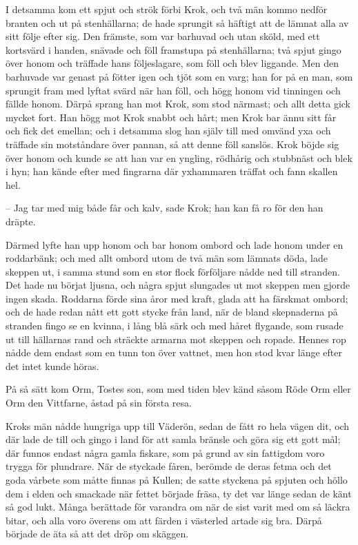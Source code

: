\initial I detsamma kom ett spjut och strök förbi Krok, och två män kommo nedför branten och ut på stenhällarna; de hade sprungit så häftigt att de lämnat alla av sitt följe efter sig. Den främste, som var barhuvad och utan sköld, med ett kortsvärd i handen, snävade och föll framstupa på stenhällarna; två spjut gingo över honom och träffade hans följeslagare, som föll och blev liggande. Men den barhuvade var genast på fötter igen och tjöt som en varg; han for på en man, som sprungit fram med lyftat svärd när han föll, och högg honom vid tinningen och fällde honom. Därpå sprang han mot Krok, som stod närmast; och allt detta gick mycket fort. Han högg mot Krok snabbt och hårt; men Krok bar ännu sitt får och fick det emellan; och i detsamma slog han själv till med omvänd yxa och träffade sin motståndare över pannan, så att denne föll sanslös. Krok böjde sig över honom och kunde se att han var en yngling, rödhårig och stubbnäst och blek i hyn; han kände efter med fingrarna där yxhammaren träffat och fann skallen hel.

– Jag tar med mig både får och kalv, sade Krok; han kan få ro för den han dräpte.

\initial Därmed lyfte han upp honom och bar honom ombord och lade honom under en roddarbänk; och med allt ombord utom de två män som lämnats döda, lade skeppen ut, i samma stund som en stor flock förföljare nådde ned till stranden. Det hade nu börjat ljusna, och några spjut slungades ut mot skeppen men gjorde ingen skada. Roddarna förde sina åror med kraft, glada att ha färskmat ombord; och de hade redan nått ett gott stycke från land, när de bland skepnaderna på stranden fingo se en kvinna, i lång blå särk och med håret flygande, som rusade ut till hällarnas rand och sträckte armarna mot skeppen och ropade. Hennes rop nådde dem endast som en tunn ton över vattnet, men hon stod kvar länge efter det intet kunde höras.

\initial På så sätt kom Orm, Tostes son, som med tiden blev känd såsom Röde Orm eller Orm den Vittfarne, åstad på sin första resa.

%
%


\initial Kroks män nådde hungriga upp till Väderön, sedan de fått ro hela vägen dit, och där lade de till och gingo i land för att samla bränsle och göra sig ett gott mål; där funnos endast några gamla fiskare, som på grund av sin fattigdom voro trygga för plundrare. När de styckade fåren, berömde de deras fetma och det goda vårbete som måtte finnas på Kullen; de satte styckena på spjuten och höllo dem i elden och smackade när fettet började fräsa, ty det var länge sedan de känt så god lukt. Många berättade för varandra om när de sist varit med om så läckra bitar, och alla voro överens om att färden i västerled artade sig bra. Därpå började de äta så att det dröp om skäggen.

